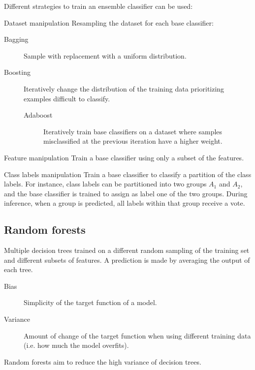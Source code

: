 Different strategies to train an ensemble classifier can be used:
\begin{descriptionlist}
    \item[Dataset manipulation] Resampling the dataset for each base classifier:
        \begin{description}
            \item[Bagging] 
                Sample with replacement with a uniform distribution.
            \item[Boosting] 
                Iteratively change the distribution of the training data 
                prioritizing examples difficult to classify.
                \begin{description}
                    \item[Adaboost] 
                        Iteratively train base classifiers on a dataset where samples 
                        misclassified at the previous iteration have a higher weight.
                \end{description}
        \end{description}
    
    \item[Feature manipulation]
        Train a base classifier using only a subset of the features.

    \item[Class labels manipulation]
        Train a base classifier to classify a partition of the class labels.
        For instance, class labels can be partitioned into two groups $A_1$ and $A_2$, and
        the base classifier is trained to assign as label one of the two groups.
        During inference, when a group is predicted, all labels within that group receive a vote.
\end{descriptionlist}


\subsection{Random forests}

Multiple decision trees trained on a different random sampling of the training set and different subsets of features.
A prediction is made by averaging the output of each tree.

\begin{description}
    \item[Bias] 
        Simplicity of the target function of a model.
    \item[Variance] 
        Amount of change of the target function when using different training data (i.e. how much the model overfits).
\end{description}

Random forests aim to reduce the high variance of decision trees.